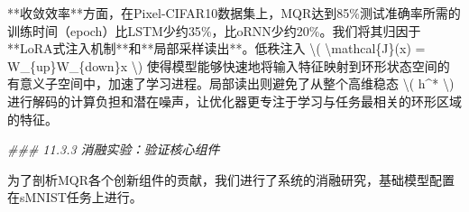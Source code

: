 \documentclass[
  12pt,
]{article}
\newenvironment{Shaded}{}{}
\newcommand{\CommentTok}[1]{\textcolor[rgb]{0.38,0.63,0.69}{\textit{#1}}}
\newcommand{\DecValTok}[1]{\textcolor[rgb]{0.25,0.63,0.44}{#1}}
\newcommand{\NormalTok}[1]{#1}
\newcommand{\OperatorTok}[1]{\textcolor[rgb]{0.40,0.40,0.40}{#1}}
\begin{document}
\begin{Shaded}
\begin{Highlighting}[]
\OperatorTok{**}\NormalTok{收敛效率}\OperatorTok{**}\NormalTok{方面，在Pixel}\OperatorTok{{-}}\NormalTok{CIFAR10数据集上，MQR达到}\DecValTok{85}\OperatorTok{\%}\NormalTok{测试准确率所需的训练时间（epoch）比LSTM少约}\DecValTok{35}\OperatorTok{\%}\NormalTok{，比oRNN少约}\DecValTok{20}\OperatorTok{\%}\NormalTok{。我们将其归因于}\OperatorTok{**}\NormalTok{LoRA式注入机制}\OperatorTok{**}\NormalTok{和}\OperatorTok{**}\NormalTok{局部采样读出}\OperatorTok{**}\NormalTok{。低秩注入 }\OperatorTok{\textbackslash{}}\NormalTok{( }\OperatorTok{\textbackslash{}}\NormalTok{mathcal\{J\}(x) }\OperatorTok{=}\NormalTok{ W\_\{up\}W\_\{down\}x }\OperatorTok{\textbackslash{}}\NormalTok{) 使得模型能够快速地将输入特征映射到环形状态空间的有意义子空间中，加速了学习进程。局部读出则避免了从整个高维稳态 }\OperatorTok{\textbackslash{}}\NormalTok{( h}\OperatorTok{\^{}*} \OperatorTok{\textbackslash{}}\NormalTok{) 进行解码的计算负担和潜在噪声，让优化器更专注于学习与任务最相关的环形区域的特征。}

\CommentTok{\#\#\# 11.3.3 消融实验：验证核心组件}

\NormalTok{为了剖析MQR各个创新组件的贡献，我们进行了系统的消融研究，基础模型配置在sMNIST任务上进行。}


\end{Highlighting}
\end{Shaded}
\end{document}
